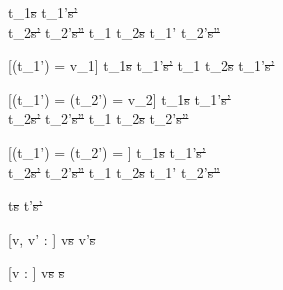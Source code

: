   {t_1\st{s}  \normalise t_1'\st{s'} \\
   t_2\st{s'} \normalise t_2'\st{s''}}
  {t_1 \And t_2\st{s} \normalise t_1' \And t_2'\st{s''}}


[\Value(t_1') = v_1]
  {t_1\st{s}  \normalise t_1'\st{s'}}
  {t_1 \Or t_2\st{s} \normalise t_1'\st{s'}}

[\Value(t_1') = \bot \land \Value(t_2') = v_2]
  {t_1\st{s}  \normalise t_1'\st{s'} \\
   t_2\st{s'} \normalise t_2'\st{s''}}
  {t_1 \Or t_2\st{s} \normalise t_2'\st{s''}}

[\Value(t_1') = \bot \land \Value(t_2') = \bot]
  {t_1\st{s}  \normalise t_1'\st{s'} \\
   t_2\st{s'} \normalise t_2'\st{s''}}
  {t_1 \Or t_2\st{s} \normalise t_1' \Or t_2'\st{s''}}












  {t\st{s}  t'\st{s'}}


[v, v' : \beta]
  { }
  {\Edit v\st{s}  \Edit v'\st{s}}

[v : \beta]
  { }
  {\Edit v\st{s} \handle{\Clear} \Fill \beta\st{s}}

